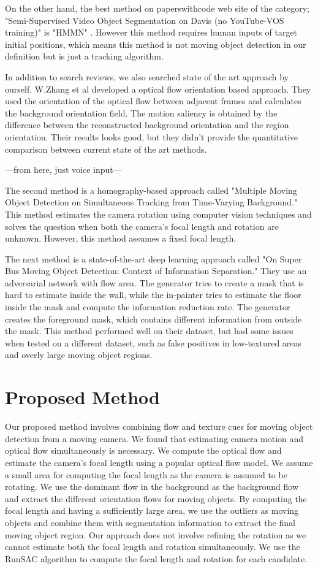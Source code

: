 \documentclass[10pt, twocolumn]{article}
\begin{document}
On the other hand, the best method on paperswithcode web site of the category; "Semi-Supervised Video Object Segmentation on Davis (no YouTube-VOS training)" is "HMMN" \cite{DBLP:journals/corr/abs-2109-11404}.
However this method requires human inputs of target initial positions, which means this method is not moving object detection in our definition but is just a tracking algorithm.

In addition to search reviews, we also searched state of the art approach by ourself.
W.Zhang et al \cite{Zhang_Sun_Yu_2020} developed a optical flow orientation based approach.
They used the orientation of the optical flow between adjacent frames and calculates the background orientation field.
The motion saliency is obtained by the difference between the reconstructed background orientation and the region orientation.
Their results looks good, but they didn't provide the quantitative comparison between current state of the art methods.

---from here, just voice input---

The second method is a homography-based approach called "Multiple Moving Object Detection on Simultaneous Tracking from Time-Varying Background." This method estimates the camera rotation using computer vision techniques and solves the question when both the camera's focal length and rotation are unknown. However, this method assumes a fixed focal length.

The next method is a state-of-the-art deep learning approach called "On Super Bus Moving Object Detection: Context of Information Separation." They use an adversarial network with flow area. The generator tries to create a mask that is hard to estimate inside the wall, while the in-painter tries to estimate the floor inside the mask and compute the information reduction rate. The generator creates the foreground mask, which contains different information from outside the mask. This method performed well on their dataset, but had some issues when tested on a different dataset, such as false positives in low-textured areas and overly large moving object regions.

\section{Proposed Method}
Our proposed method involves combining flow and texture cues for moving object detection from a moving camera. We found that estimating camera motion and optical flow simultaneously is necessary. We compute the optical flow and estimate the camera's focal length using a popular optical flow model. We assume a small area for computing the focal length as the camera is assumed to be rotating. We use the dominant flow in the background as the background flow and extract the different orientation flows for moving objects. By computing the focal length and having a sufficiently large area, we use the outliers as moving objects and combine them with segmentation information to extract the final moving object region. Our approach does not involve refining the rotation as we cannot estimate both the focal length and rotation simultaneously. We use the RunSAC algorithm to compute the focal length and rotation for each candidate.
\end{document}
